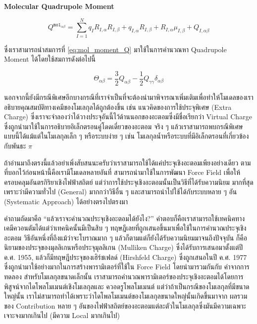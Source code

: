 \noindent \textbf{Molecular Quadrupole Moment}

\begin{equation}
  \label{eq:mol_moment_Q}
  Q^{\texttt{mol}_{\alpha \beta}}
  =
  \sum^{N}_{I=1} q_{I} R_{I,\alpha} R_{I,\beta}
  + q_{I,\alpha} R_{I,\beta}
  + R_{I,\alpha} \mu_{I,\beta}
  + Q_{I,\alpha \beta}
\end{equation}

\noindent ซึ่งเราสามารถนำสมการที่ \eqref{eq:mol_moment_Q} มาใช้ในการคำนวณหา Quadrupole Moment ได้โดยใช้สมการดังต่อไปนี้

\begin{equation}
  \Theta_{\alpha \beta}
  =
  \frac{3}{2} Q_{\alpha \beta} - \frac{1}{2} Q_{\gamma \gamma} \delta_{\alpha \beta}
\end{equation}

นอกจากนี้ยังมีกรณีพิเศษอีกบางกรณีที่เราจำเป็นที่จะต้องนำมาพิจารณาเพิ่มเติมเพื่อทำให้โมเดลของเราอธิบายคุณสมบัติทางเคมีของโมเลกุลได้ถูกต้องขึ้น
เช่น แนวคิดของการใช้ประจุพิเศษ (Extra Charge) ซึ่งเราจะจำลองว่าได้วางประจุอันนี้ไว้ด้านนอกของอะตอมซึ่งมีชื่อเรียกว่า Virtual Charge
ซึ่งถูกนำมาใช้ในการอธิบายอิเล็กตรอนคู่โดดเดี่ยวของอะตอม จริง ๆ แล้วเราสามารถพบกรณีพิเศษแบบนี้ได้แม้แต่ในโมเลกุลเล็ก ๆ หรือระบบง่าย ๆ
เช่น โมเลกุลน้ำหรือระบบที่มีอิเล็กตรอนที่เกี่ยวข้องกับพันธะ $\pi$

ถ้าอ่านมาถึงตรงนี้แล้วอย่าเพิ่งสับสนนะครับว่าเราสามารถใช้ได้แค่ประจุเชิงอะตอมเพียงอย่างเดียว ตามที่บอกไว้ก่อนหน้านี้คือเรามีโมเดลหลายอันที่%
สามารถนำมาใช้ในการพัฒนา Force Field เพื่อให้ครอบคลุมอันตรกิริยาเชิงไฟฟ้าสถิตย์ แต่ว่าการใช้ประจุเชิงอะตอมนั้นเป็นวิธีที่ได้รับความนิยม%
มากที่สุดเพราะว่ามีความทั่วไป (General) มากกว่าวิธีอื่น ๆ และสามารถนำไปใช้ได้กับระบบหลาย ๆ อัน (Systematic Approach)
ได้อย่างตรงไปตรงมา

คำถามถัดมาคือ \enquote{แล้วเราจะคำนวณประจุเชิงอะตอมได้ยังไง?} คำตอบก็คือเราสามารถใช้เทคนิคทางเคมีควอนตัมได้แต่ว่าเทคนิคนั้นมีเป็นสิบ ๆ
ทฤษฎีเลยที่ถูกเสนอขึ้นมาเพื่อใช้ในการคำนวณประจุเชิงอะตอม วิธีอันหนึ่งที่ถึงแม้ว่าจะโบราณมาก ๆ แล้วก็ตามแต่ก็ยังได้รับความนิยมมาจนถึงปัจจุบัน%
ก็คือนิยามของประจุของมุลลิเกนหรือประจุมุลลิเกน (Mulliken Charge) ซึ่งได้รับการเสนอมาตั้งแต่ปี ค.ศ. 1955, แล้วก็มีทฤษฎีประจุของเฮิร์ชเฟลด์
(Hirshfeld Charge) ซึ่งถูกเสนอในปี ค.ศ. 1977 ซึ่งถูกนำมาใช้อย่างมากในการสร้างพารามิเตอร์ที่ใช้ใน Force Field โดยนำมารวมกันกับ%
ค่าจากการทดลอง สำหรับโมเลกุลขนาดเล็กนั้น เราสามารถคำนวณพารามิเตอร์ของประจุเชิงอะตอมได้โดยการพิสูจน์จากไดโพลโมเมนต์เชิงโมเลกุลและ%
ควอดรูโพลโมเมนต์ แต่ว่าถ้าเป็นกรณีของโมเลกุลที่มีขนาดใหญ่นั้น เราไม่สามารถทำได้เพราะว่าไดโพลโมเมนต์ของโมเลกุลขนาดใหญ่นั้นเกิดขึ้นมาจาก%
ผลรวมของ Contribution หลาย ๆ อันของไฟฟ้าสถิตย์ของอะตอมแต่ละตัวในโมเลกุลซึ่งมันมีความเฉพาะเจาะจงมากเกินไป (มีความ Local มากเกินไป)

